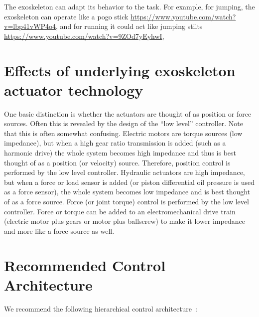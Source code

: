 \documentclass[letterpaper,12pt,fullpage]{article}
\begin{document}
The exoskeleton can adapt its behavior to the task.
For example, for jumping, the exoskeleton can operate like a pogo 
stick \url{https://www.youtube.com/watch?v=lbp41vWP4o4}, 
and for running it could act like jumping 
stilts \url{https://www.youtube.com/watch?v=9ZOd7yEyhwI},

\section{Effects of underlying exoskeleton actuator technology}

One basic distinction is whether the actuators are thought of as position
or force sources. Often this is revealed by the design of the ``low level''
controller. Note that this is often somewhat confusing. Electric motors
are torque sources (low impedance), but when a high gear ratio transmission
is added (such as a harmonic drive) the whole system becomes high impedance
and thus is best thought of as a position (or velocity) source. Therefore,
position control is performed by the low level controller. Hydraulic actuators
are high impedance, but when a force or load sensor is added (or piston differential
oil pressure is used as a force sensor), the whole system becomes low impedance
and is best thought of as a force source. Force (or joint torque) control is
performed by the low level controller. Force or torque can be added to an
electromechanical drive train (electric motor plus gears or motor plus ballscrew)
to make it lower impedance and more like a force source as well.

\section{Recommended Control Architecture}
\label{sec:architecture}

We recommend the following hierarchical control architecture~\cite{IEEE06907051}:
\end{document}
